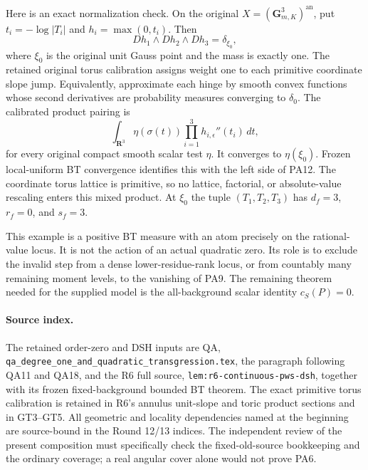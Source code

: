 Here is an exact normalization check.  On the original
$X=(\mathbf G_{m,K}^3)^{\mathrm{an}}$, put
$t_i=-\log|T_i|$ and $h_i=\max(0,t_i)$.  Then
\[
                     D h_1\wedge D h_2\wedge D h_3
                                  =\delta_{\xi_0},
 \tag{PA12}
\]
where $\xi_0$ is the original unit Gauss point and the mass
is exactly one.  The retained original torus calibration
assigns weight one to each primitive coordinate slope jump.
Equivalently, approximate each hinge by smooth convex functions
whose second derivatives are probability measures converging
to $\delta_0$.  The calibrated product pairing is
\[
  \int_{\mathbf R^3}\eta(\sigma(t))
              \prod_{i=1}^3 h_{i,\epsilon}''(t_i)\,dt,
 \tag{PA13}
\]
for every original compact smooth scalar test $\eta$.
It converges to $\eta(\xi_0)$.  Frozen local-uniform BT
convergence identifies this with the left side of PA12.
The coordinate torus lattice is primitive, so no lattice,
factorial, or absolute-value rescaling enters this mixed
product.  At $\xi_0$ the tuple $(T_1,T_2,T_3)$ has
$d_f=3$, $r_f=0$, and $s_f=3$.

This example is a positive BT measure with an atom precisely
on the rational-value locus.  It is not the action of an
actual quadratic zero.  Its role is to exclude the invalid
step from a dense lower-residue-rank locus, or from countably
many remaining moment levels, to the vanishing of PA9.
The remaining theorem needed for the supplied model is the
all-background scalar identity $c_S(P)=0$.

\paragraph{Source index.}
The retained order-zero and DSH inputs are QA,
\texttt{qa\_degree\_one\_and\_quadratic\_transgression.tex},
the paragraph following QA11 and QA18, and the R6 full source,
\texttt{lem:r6-continuous-pws-dsh}, together with its frozen
fixed-background bounded BT theorem.  The exact primitive
torus calibration is retained in R6's annulus unit-slope and
toric product sections and in GT3--GT5.  All geometric and
locality dependencies named at the beginning are source-bound
in the Round 12/13 indices.  The independent review of the
present composition must specifically check the fixed-old-source
bookkeeping and the ordinary coverage; a real angular cover
alone would not prove PA6.

